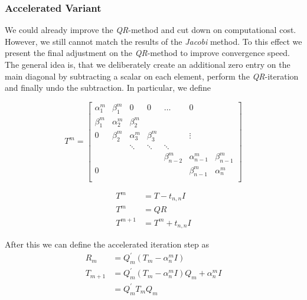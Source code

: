 \documentclass[12pt]{article}
\begin{document}
\subsubsection{Accelerated Variant}

We could already improve the \textit{QR}-method and cut down on computational cost. However, we still cannot match the results of the \textit{Jacobi} method. To this effect we present the final adjustment on the \textit{QR}-method to improve convergence speed. The general idea is, that we deliberately create an additional zero entry on the main diagonal by subtracting a scalar on each element, perform the \textit{QR}-iteration and finally undo the subtraction. In particular, we define

\begin{equation}
\label{qrm3-prop}
T^{m} = \begin{bmatrix}

\alpha^{m}_1 & \beta^{m}_1  & 0            & 0            & \dots            & 0                                  \\
\beta^{m}_1  & \alpha^{m}_2 & \beta^{m}_2                                                                         \\
0            & \beta^{m}_2  & \alpha^{m}_3 & \beta^{m}_3  &                  & \vdots                             \\
             &              & \ddots       & \ddots       & \ddots                                                \\
             &              &              &              & \beta^{m}_{n-2}  & \alpha^{m}_{n-1} & \beta^{m}_{n-1} \\
0            &              &              &              &                  & \beta^{m}_{n-1}  & \alpha^{m}_n    \\

\end{bmatrix}
\end{equation}


\begin{align*}
T^{m}       &= T - t _{n, n} I \\
T^{m}       &= QR \\
T^{m+1}     &= T^{m} + t _{n, n} I
\end{align*}

After this we can define the accelerated iteration step as
\begin{align}
\label{qrm3}
R_m &= Q^{\prime}_m\left(T_m - \alpha_n^{m}I\right) \\
T_{m+1} &= Q^{\prime}_m\left(T_m - \alpha_n^{m}I\right)Q_m + \alpha_n^{m}I \\
        &= Q^{\prime}_m T_m Q_m
\end{align}
\end{document}
